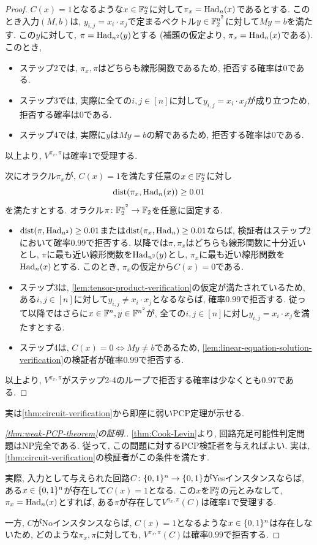 \begin{proof}
    $C(x)=1$となるような$x\in\mathbb{F}_2^n$に対して$\pi_x=\mathrm{Had}_n(x)$であるとする.
    このとき入力$(M,b)$は, $y_{i,j}=x_i\cdot x_j$で定まるベクトル$y\in\mathbb{F}_2^{n^2}$に対して$My=b$を満たす.
    この$y$に対して, $\pi=\mathrm{Had}_{n^2}(y)$とする (補題の仮定より, $\pi_x=\mathrm{Had}_n(x)$である).
    このとき, 
    \begin{itemize}
      \item ステップ2では, $\pi_x,\pi$はどちらも線形関数であるため, 拒否する確率は$0$である.
      \item ステップ3では, 実際に全ての$i,j\in [n]$に対して$y_{i,j}=x_i\cdot x_j$が成り立つため, 拒否する確率は$0$である.
      \item ステップ4では, 実際に$y$は$My=b$の解であるため, 拒否する確率は$0$である.
    \end{itemize}
    以上より, $V^{\pi_x,\pi}$は確率$1$で受理する.

    次にオラクル$\pi_x$が, $C(x)=1$を満たす任意の$x\in\mathbb{F}_2^n$に対し
    \[\mathrm{dist}(\pi_x,\mathrm{Had}_n(x))\ge 0.01\]
    を満たすとする. オラクル$\pi\colon\mathbb{F}_2^{n^2}\to\mathbb{F}_2$を任意に固定する.

    \begin{itemize}
      \item $\mathrm{dist}(\pi,\mathrm{Had}_{n^2})\ge 0.01$または$\mathrm{dist}(\pi_x,\mathrm{Had}_n)\ge 0.01$ならば, 検証者はステップ2において確率$0.99$で拒否する. 以降では$\pi,\pi_x$はどちらも線形関数に十分近いとし, $\pi$に最も近い線形関数を$\mathrm{Had}_{n^2}(y)$とし, $\pi_x$に最も近い線形関数を$\mathrm{Had}_n(x)$とする. このとき, $\pi_x$の仮定から$C(x)=0$である.
      \item ステップ3は, \cref{lem:tensor-product-verification}の仮定が満たされているため, ある$i,j\in[n]$に対して$y_{i,j}\ne x_i\cdot x_j$となるならば, 確率$0.99$で拒否する.
      従って以降ではさらに$x\in\mathbb{F}^n,y\in\mathbb{F}^{n^2}$が, 全ての$i,j\in [n]$に対し$y_{i,j}=x_i\cdot x_j$を満たすとする.
      \item ステップ4は, $C(x)=0\iff My\ne b$であるため, \cref{lem:linear-equation-solution-verification}の検証者が確率$0.99$で拒否する.
    \end{itemize}
    以上より, $V^{\pi_x,\pi}$がステップ2-4のループで拒否する確率は少なくとも$0.97$である.
  \end{proof}
    
  実は\cref{thm:circuit-verification}から即座に弱いPCP定理が示せる.
  \begin{proof}[\cref{thm:weak-PCP-theorem}の証明.]
    \cref{thm:Cook-Levin}より, 回路充足可能性判定問題はNP完全である.
    従って, この問題に対するPCP検証者を与えればよい.
    実は, \cref{thm:circuit-verification}の検証者がこの条件を満たす.

    実際,
    入力として与えられた回路$C\colon\{0,1\}^n\to\{0,1\}$がYesインスタンスならば,
    ある$x\in\{0,1\}^n$が存在して$C(x)=1$となる.
    この$x$を$\mathbb{F}_2^n$の元とみなして, $\pi_x = \mathrm{Had}_n(x)$とすれば, ある$\pi$が存在して$V^{\pi_x,\pi}(C)$は確率$1$で受理する.

    一方, $C$がNoインスタンスならば, $C(x)=1$となるような$x\in\{0,1\}^n$は存在しないため, どのような$\pi_x,\pi$に対しても, $V^{\pi_x,\pi}(C)$は確率$0.99$で拒否する.    
  \end{proof}

